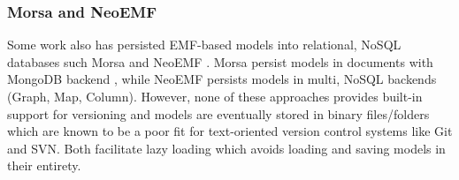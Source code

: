 \subsubsection{Morsa and NeoEMF}
\label{sec:morsa_neoemf}
Some work also has persisted EMF-based models into relational, NoSQL databases such Morsa \cite{DBLP:conf/models/Espinazo-PaganCM11} and NeoEMF \cite{daniel2016neoemf}. Morsa  persist models in documents with MongoDB backend \cite{mongodb}, while NeoEMF persists models in multi, NoSQL backends (Graph, Map, Column). However, none of these approaches provides built-in support for versioning and models are eventually stored in binary files/folders which are known to be a poor fit for text-oriented version control systems like Git and SVN. Both facilitate lazy loading which avoids loading and saving models in their entirety.

